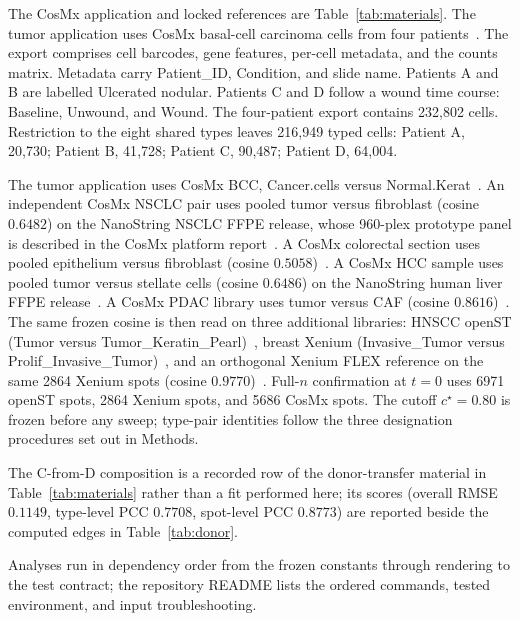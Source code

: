 The CosMx application and locked references are Table~\ref{tab:materials}. The tumor application uses CosMx basal-cell carcinoma cells from four patients~\citep{Andreatta2024zenodo,Yerly2022,Yerly2025preprint}. The export comprises cell barcodes, gene features, per-cell metadata, and the counts matrix. Metadata carry Patient\_ID, Condition, and slide name. Patients A and B are labelled Ulcerated nodular. Patients C and D follow a wound time course: Baseline, Unwound, and Wound. The four-patient export contains 232{,}802 cells. Restriction to the eight shared types leaves 216{,}949 typed cells: Patient A, 20{,}730; Patient B, 41{,}728; Patient C, 90{,}487; Patient D, 64{,}004.

The tumor application uses CosMx BCC, Cancer.cells versus Normal.Kerat~\citep{He2022,Andreatta2024zenodo}. An independent CosMx NSCLC pair uses pooled tumor versus fibroblast (cosine \(0.6482\)) on the NanoString NSCLC FFPE release, whose 960-plex prototype panel is described in the CosMx platform report~\citep{He2022,Sun2025spatial}. A CosMx colorectal section uses pooled epithelium versus fibroblast (cosine \(0.5058\))~\citep{Crowell2025preprint}. A CosMx HCC sample uses pooled tumor versus stellate cells (cosine \(0.6486\)) on the NanoString human liver FFPE release~\citep{Sun2025spatial}. A CosMx PDAC library uses tumor versus CAF (cosine \(0.8616\))~\citep{Pei2025}. The same frozen cosine is then read on three additional libraries: HNSCC openST (Tumor versus Tumor\_Keratin\_Pearl)~\citep{Schott2024}, breast Xenium (Invasive\_Tumor versus Prolif\_Invasive\_Tumor)~\citep{Janesick2023}, and an orthogonal Xenium FLEX reference on the same 2864 Xenium spots (cosine \(0.9770\))~\citep{Janesick2023}. Full-\(n\) confirmation at \(t=0\) uses 6971 openST spots, 2864 Xenium spots, and 5686 CosMx spots. The cutoff \(c^\star=0.80\) is frozen before any sweep; type-pair identities follow the three designation procedures set out in Methods.

The C-from-D composition is a recorded row of the donor-transfer material in Table~\ref{tab:materials} rather than a fit performed here; its scores (overall RMSE \(0.1149\), type-level PCC \(0.7708\), spot-level PCC \(0.8773\)) are reported beside the computed edges in Table~\ref{tab:donor}.

Analyses run in dependency order from the frozen constants through rendering to the test contract; the repository README lists the ordered commands, tested environment, and input troubleshooting.
